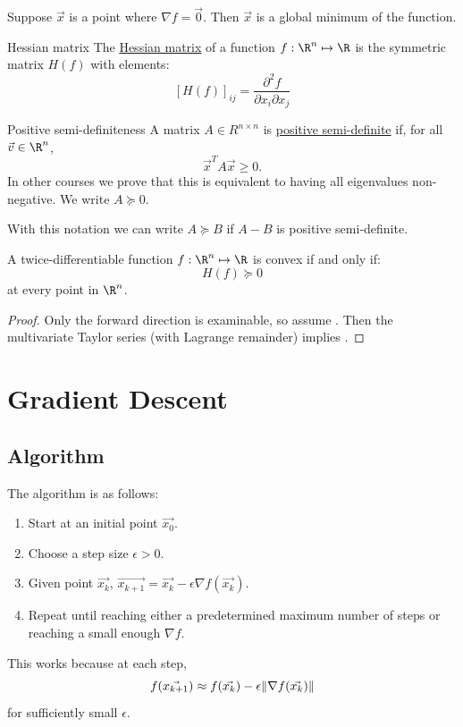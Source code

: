 \documentclass[../Main.tex]{subfiles}
\begin{document}
\begin{corollary}
    Suppose $\vec{x}$ is a point where $\nabla f = \vec0$. Then $\vec{x}$ is a global minimum of the function.
    \label{corLocalMinIsGlobal}
\end{corollary}
\begin{definition}{Hessian matrix}
    The \underline{Hessian matrix} of a function $f : \R^n \mapsto \R$ is the symmetric matrix $H(f)$ with elements:
    \begin{equation*}
        \left[H(f)\right]_{ij} = \frac{\partial^{2}f}{\partial x_i\partial x_j}
    \end{equation*}
\end{definition}
\begin{definition}{Positive semi-definiteness}
    A matrix $A \in R^{n \times n}$ is \underline{positive semi-definite} if, for all $\vec{v} \in \R^n$,
    \begin{equation*}
        \vec{x}^T A \vec{x} \geq 0.
    \end{equation*}
    In other courses we prove that this is equivalent to having all eigenvalues non-negative. We write $A \succeq 0$.
\end{definition}
With this notation we can write $A \succeq B$ if $A-B$ is positive semi-definite.
\begin{theorem}
    A twice-differentiable function $f : \R^n \mapsto \R$ is convex if and only if:
    \begin{equation}
        H(f) \succeq 0
        \label{eqnConvexSecondOrder}
    \end{equation}
    at every point in $\R^n$.
    \label{thmConvexSecondOrder}
\end{theorem}
\begin{proof}
    Only the forward direction is examinable, so assume . Then the multivariate Taylor series (with Lagrange remainder) implies .
\end{proof}
\section{Gradient Descent}
\subsection{Algorithm}
The algorithm is as follows:
\begin{enumerate}
    \item Start at an initial point $\vec{x_0}$.
    \item Choose a step size $\epsilon > 0$.
    \item Given point $\vec{x_k}$, $\vec{x_{k+1}} = \vec{x_k} - \epsilon\nabla f(\vec{x_k})$.
    \item Repeat until reaching either a predetermined maximum number of steps or reaching a small enough $\nabla f$.
\end{enumerate}
This works because at each step,
\begin{equation*}
    f(\vec{x_{k+1}}) \approx f(\vec{x_k}) - \epsilon \lVert\nabla f(\vec{x_k})\rVert
\end{equation*}
for sufficiently small $\epsilon$.
\end{document}

